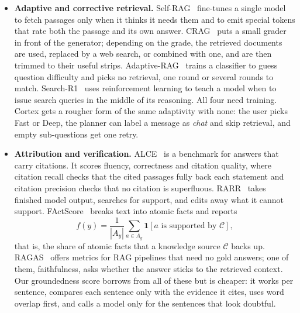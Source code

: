 \documentclass[oneside,a4paper,12pt]{report}
\begin{document}
\begin{itemize}
We had no way to train such a policy on hosted free-tier models, so Cortex borrows three of GRASP's lessons as fixed rules instead. First, evidence is kept small: each item is a quote of a few hundred characters with title, author, time and link, and no more than 16 items reach the model. Second, searches use keywords, because the Gmail, Slack and GitHub search APIs are keyword-based anyway; only memory recall can be semantic, and only when Oracle Agent Memory is switched on. Third, the number of retrieval rounds is capped, with one wider retry for a sub-question that found nothing.

\item \textbf{Adaptive and corrective retrieval.} Self-RAG~\cite{asai2024selfrag} fine-tunes a single model to fetch passages only when it thinks it needs them and to emit special tokens that rate both the passage and its own answer. CRAG~\cite{yan2024crag} puts a small grader in front of the generator; depending on the grade, the retrieved documents are used, replaced by a web search, or combined with one, and are then trimmed to their useful strips. Adaptive-RAG~\cite{jeong2024adaptiverag} trains a classifier to guess question difficulty and picks no retrieval, one round or several rounds to match. Search-R1~\cite{jin2025searchr1} uses reinforcement learning to teach a model when to issue search queries in the middle of its reasoning. All four need training. Cortex gets a rougher form of the same adaptivity with none: the user picks Fast or Deep, the planner can label a message as \emph{chat} and skip retrieval, and empty sub-questions get one retry.

\item \textbf{Attribution and verification.} ALCE~\cite{gao2023alce} is a benchmark for answers that carry citations. It scores fluency, correctness and citation quality, where citation recall checks that the cited passages fully back each statement and citation precision checks that no citation is superfluous. RARR~\cite{gao2023rarr} takes finished model output, searches for support, and edits away what it cannot support. FActScore~\cite{min2023factscore} breaks text into atomic facts and reports
\[ f(y) = \frac{1}{|A_y|} \sum_{a \in A_y} \mathbf{1}[a \mbox{ is supported by } \mathcal{C}], \]
that is, the share of atomic facts that a knowledge source $\mathcal{C}$ backs up. RAGAS~\cite{es2024ragas} offers metrics for RAG pipelines that need no gold answers; one of them, faithfulness, asks whether the answer sticks to the retrieved context. Our groundedness score borrows from all of these but is cheaper: it works per sentence, compares each sentence only with the evidence it cites, uses word overlap first, and calls a model only for the sentences that look doubtful.


\end{itemize}
\end{document}
